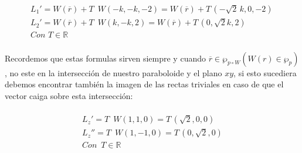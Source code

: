 \documentclass[11pt,letterpaper]{article}
\newcommand{\R}{\mathbb{R}}
\begin{document}
        \begin{align*}
            L_1'=W(\overline{r})+T\,\,\,W(-k,-k,-2)=W(\overline{r})+T\,(-\sqrt{2}\,k,0,-2)\,\\
            L_2'=W(\overline{r})+T\,\,\,W(k,-k,2)=W(\overline{r})+T\,(0,\sqrt{2}k,2)\,\\
            Con\,\,T\in \R
        \end{align*}\,\\
        Recordemos que estas formulas sirven siempre y cuando $\overline{r}\in \wp_{p\circ W}(W(r)\in \wp_{p})$, no este en la intersecci\'on de nuestro paraboloide y el plano $xy$, si esto sucediera debemos encontrar tambi\'en la imagen de las rectas triviales en caso de que el vector caiga sobre esta intersecci\'on:\,\\
        \,\\
        \begin{align*}
            L_z'=T\,\,\,W(1,1,0)=T\,(\sqrt{2},0,0)\\
            L_z''=T\,\,\,W(1,-1,0)=T\,(0,\sqrt{2},0)\\
            Con\,\,\,T\in \R
        \end{align*}
\end{document}
